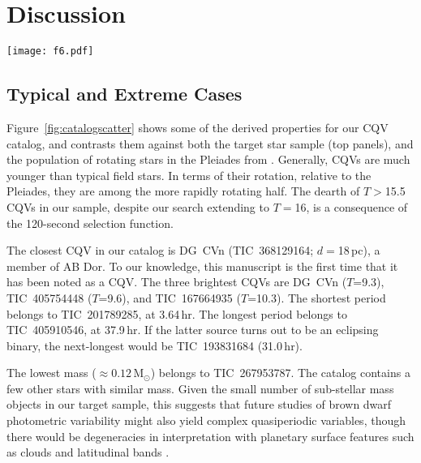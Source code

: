\documentclass[11pt,twocolumn,tighten]{aastex63}
\begin{document}
\section{Discussion}
\label{sec:discussion}

\begin{figure*}[!t]
	\begin{center}
		\centering
		\texttt{[image: f6.pdf]}
		\vspace{-0.45cm}
		\caption{
      {\bf Properties of CQVs from our serach}.
      The \ngoods\ bonafide CQVs in Table~\ref{tab:thetable} are 
      the black circles; \nmaybes\ candidate CQVs are gray circles.
      The \nstarssearched\ target stars with 120-second cadence data
      acquired by TESS between July~2018 and Sep~2022 are shown as the shaded background on the top panels,
      where darker regions correspond to a larger relative number of observed stars.
      {\bf lgb todo: P vs color needs Pleiades comparison}
		}
		\label{fig:catalogscatter}
	\end{center}
\end{figure*}


\subsection{Typical and Extreme Cases}
\label{subsec:extreme}
Figure~\ref{fig:catalogscatter} shows some of the derived properties
for our CQV catalog, and contrasts them against both the target star
sample (top panels), and the population of rotating stars in the Pleiades
from \citet{2016AJ....152..114R}.
Generally, CQVs are much younger than typical field stars. 
In terms of their rotation, relative to the Pleiades,
they are among the more rapidly rotating half.
The dearth of $T$$>$15.5 CQVs in our sample, despite our search extending
to $T$$=$16, is a consequence of the 120-second selection function.
%

The closest CQV in our catalog is DG~CVn (TIC~368129164;
$d$$=$18\,pc), a member of AB Dor.  To our knowledge, this manuscript
is the first time that it has been noted as a CQV.  The three
brightest CQVs are DG~CVn ($T$=9.3), TIC~405754448 ($T$=9.6), and
TIC~167664935 ($T$=10.3).  The shortest period belongs to
TIC~201789285, at 3.64\,hr.  The longest period belongs to
TIC~405910546, at 37.9\,hr.  If the latter source turns out to be an
eclipsing binary, the next-longest would be TIC~193831684 (31.0\,hr).

The lowest mass ($\approx 0.12$\,M$_\odot$) belongs to TIC~267953787.
The catalog contains a few other stars with similar mass.  Given the
small number of sub-stellar mass objects in our target sample, this
suggests that future studies of brown dwarf photometric variability
might also yield complex quasiperiodic variables, though there would
be degeneracies in interpretation with planetary surface features such
as clouds and latitudinal bands
\citep[e.g.][]{2021ApJ...906...64A,2022ApJ...924...68V}.
\end{document}
